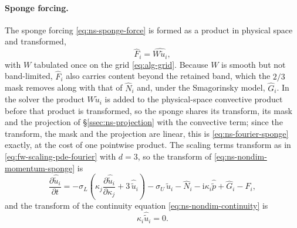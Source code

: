 \documentclass{article}
\begin{document}
\paragraph{Sponge forcing.} The sponge forcing
\eqref{eq:ns-sponge-force} is formed as a product in physical space
and transformed,
\begin{equation}\label{eq:ns-fourier-sponge}
  \hat{F}_i = \widehat{W \tilde u_i},
\end{equation}
with $W$ tabulated once on the grid \eqref{eq:alg-grid}. Because $W$ is smooth
but not band-limited, $\hat{F}_i$ also carries content beyond the retained
band, which the $2/3$ mask removes along with that of $\hat{N}_i$ and,
under the Smagorinsky model, $\hat{G}_i$. In the solver the product
$W \tilde u_i$ is added to the physical-space convective product before that
product is transformed, so the sponge shares its transform, its mask and the
projection of \S\ref{ssec:ns-projection} with the convective term; since the
transform, the mask and the projection are linear, this is
\eqref{eq:ns-fourier-sponge} exactly, at the cost of one pointwise product. The scaling terms transform as in
\eqref{eq:fw-scaling-pde-fourier} with $d = 3$, so the transform of
\eqref{eq:ns-nondim-momentum-sponge} is
\begin{equation}\label{eq:ns-nondim-momentum-fourier}
  \frac{\partial \hat{\tilde u}_i}{\partial t}
  = -\sigma_L \left( \kappa_j \frac{\partial \hat{\tilde u}_i}{\partial \kappa_j} + 3\, \hat{\tilde u}_i \right)
  - \sigma_U\, \hat{\tilde u}_i
  - \hat{N}_i
  - \mathrm{i} \kappa_i \hat{\tilde p}
  + \hat{G}_i
  - \hat{F}_i,
\end{equation}
and the transform of the continuity equation
\eqref{eq:ns-nondim-continuity} is
\begin{equation}\label{eq:ns-fourier-continuity}
  \kappa_i \hat{\tilde u}_i = 0.
\end{equation}
\end{document}
